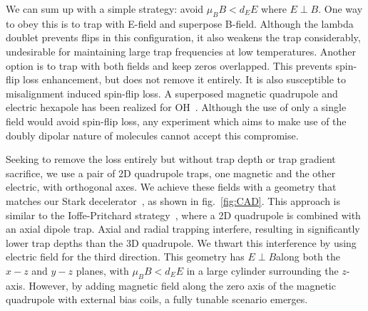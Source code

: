 \documentclass[%
 reprint,
groupedaddress,
 amsmath,amssymb,
 aps,
prl,
]{revtex4-1}
\newcommand{\epb}{$E\!\perp\!B$}
\begin{document}
We can sum up with a simple strategy: avoid $\mu_BB < d_EE$ where \epb. One way to obey this is to trap with E-field and superpose B-field. Although the lambda doublet prevents flips in this configuration, it also weakens the trap considerably, undesirable for maintaining large trap frequencies at low temperatures. Another option is to trap with both fields and keep zeros overlapped. This prevents spin-flip loss enhancement, but does not remove it entirely. It is also susceptible to misalignment induced spin-flip loss. A superposed magnetic quadrupole and electric hexapole has been realized for OH~\cite{Sawyer2007}. Although the use of only a single field would avoid spin-flip loss, any experiment which aims to make use of the doubly dipolar nature of molecules cannot accept this compromise.

Seeking to remove the loss entirely but without trap depth or trap gradient sacrifice, we use a pair of 2D quadrupole traps, one magnetic and the other electric, with orthogonal axes. We achieve these fields with a geometry that matches our Stark decelerator~\cite{Bochinski2003}, as shown in fig.~\ref{fig:CAD}. This approach is similar to the Ioffe-Pritchard strategy~\cite{pritchard1983}, where a 2D quadrupole is combined with an axial dipole trap. Axial and radial trapping interfere, resulting in significantly lower trap depths than the 3D quadrupole. We thwart this interference by using electric field for the third direction. This geometry has \epb along both the $x-z$ and $y-z$ planes, with $\mu_BB < d_EE$ in a large cylinder surrounding the $z$-axis. However, by adding magnetic field along the zero axis of the magnetic quadrupole with external bias coils, a fully tunable scenario emerges. %

\end{document}
